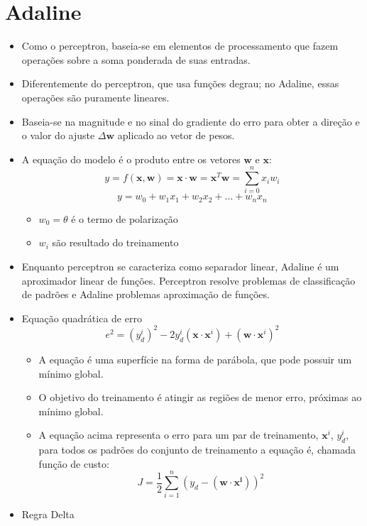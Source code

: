 \documentclass{article}
\begin{document}
\section{Adaline}

	\begin{itemize}
		\item Como o perceptron, baseia-se em elementos de processamento que fazem operações sobre a soma ponderada de suas entradas.
		\item Diferentemente do perceptron, que usa funções degrau; no Adaline, essas operações são puramente lineares.
		\item Baseia-se na magnitude e no sinal do gradiente do erro para obter a direção e o valor do ajuste $\Delta \mathbf{w}$ aplicado ao vetor de pesos.		
		\item A equação do modelo é o produto entre os vetores $\mathbf{w}$ e $\mathbf{x}$:
		$$ y = f(\mathbf{x}, \mathbf{w}) = \mathbf{x} \cdot \mathbf{w} = \mathbf{x}^T \mathbf{w} = \sum_{i=0}^{n} x_i w_i$$
		$$ y = w_0 + w_1 x_1 + w_2 x_2 + ... + w_n x_n $$
		\begin{itemize}
			\item $w_0 = \theta$ é o termo de polarização
			\item $w_i$ são resultado do treinamento
		\end{itemize}
		\item Enquanto perceptron se caracteriza como separador linear, Adaline é um aproximador linear de funções. Perceptron resolve problemas de classificação de padrões e Adaline problemas aproximação de funções.
		\item Equação quadrática de erro
		$$ e^2 = (y_d^i)^2 - 2y_d^i(\mathbf{x} \cdot \mathbf{x}^i)+(\mathbf{w} \cdot \mathbf{x}^i)^2$$
		\begin{itemize}
			\item A equação é uma superfície na forma de parábola, que pode possuir um mínimo global.
			\item O objetivo do treinamento é atingir as regiões de menor erro, próximas ao mínimo global.
			\item A equação acima representa o erro para um par de treinamento, $\mathbf{x}^i$, $y_d^i$, para todos os padrões do conjunto de treinamento a equação é, chamada função de custo:
			$$ J = \frac{1}{2} \sum_{i=1}^{n} (y_d - (\mathbf{w} \cdot \mathbf{x^i}))^2$$
		\end{itemize}		
		\item Regra Delta
		\begin{itemize}

\end{itemize}
\end{itemize}
\end{document}
